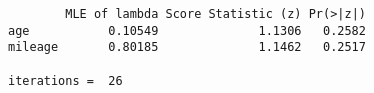 \begin{verbatim}        MLE of lambda Score Statistic (z) Pr(>|z|)
age           0.10549              1.1306   0.2582
mileage       0.80185              1.1462   0.2517

iterations =  26 
\end{verbatim}